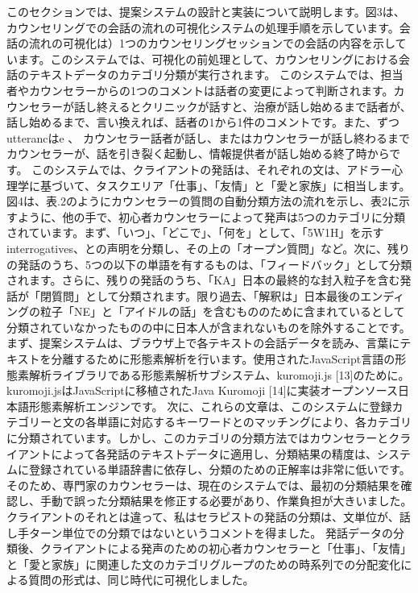 \documentclass[shuuron]{kuee}
\begin{document}
  このセクションでは、提案システムの設計と実装について説明します。図3は、カウンセリングでの会話の流れの可視化システムの処理手順を示しています。会話の流れの可視化は）1つのカウンセリングセッションでの会話の内容を示しています。このシステムでは、可視化の前処理として、カウンセリングにおける会話のテキストデータのカテゴリ分類が実行されます。
  このシステムでは、担当者やカウンセラーからの1つのコメントは話者の変更によって判断されます。カウンセラーが話し終えるとクリニックが話すと、治療が話し始めるまで話者が、話し始めるまで、言い換えれば、話者の1から1件のコメントです。また、ずつutterancはe  、 カウンセラー話者が話し、またはカウンセラーが話し終わるまでカウンセラーが、話を引き裂く起動し、情報提供者が話し始める終了時からです。
  このシステムでは、クライアントの発話は、それぞれの文は、アドラー心理学に基づいて、タスクエリア「仕事」、「友情」と「愛と家族」に相当します。図4は、表.2のようにカウンセラーの質問の自動分類方法の流れを示し、表2に示すように、他の手で、初心者カウンセラーによって発声は5つのカテゴリに分類されています。まず、「いつ」、「どこで」、「何を」として、「5W1H」を示すinterrogatives、との声明を分類し、その上の「オープン質問」など。次に、残りの発話のうち、5つの以下の単語を有するものは、「フィードバック」として分類されます。さらに、残りの発話のうち、「KA」日本の最終的な封入粒子を含む発話が「閉質問」として分類されます。限り過去、「解釈は」日本最後のエンディングの粒子「NE」と「アイドルの話」を含むもののために含まれているとして分類されていなかったものの中に日本人が含まれないものを除外することです。
まず、提案システムは、ブラウザ上で各テキストの会話データを読み、言葉にテキストを分離するために形態素解析を行います。使用されたJavaScript言語の形態素解析ライブラリである形態素解析サブシステム、kuromoji.js [13]のために。 kuromoji.jsはJavaScriptに移植されたJava Kuromoji [14]に実装オープンソース日本語形態素解析エンジンです。
  次に、これらの文章は、このシステムに登録カテゴリーと文の各単語に対応するキーワードとのマッチングにより、各カテゴリに分類されています。しかし、このカテゴリの分類方法ではカウンセラーとクライアントによって各発話のテキストデータに適用し、分類結果の精度は、システムに登録されている単語辞書に依存し、分類のための正解率は非常に低いです。そのため、専門家のカウンセラーは、現在のシステムでは、最初の分類結果を確認し、手動で誤った分類結果を修正する必要があり、作業負担が大きいました。クライアントのそれとは違って、私はセラピストの発話の分類は、文単位が、話し手ターン単位での分類ではないというコメントを得ました。
発話データの分類後、クライアントによる発声のための初心者カウンセラーと「仕事」、「友情」と「愛と家族」に関連した文のカテゴリグループのための時系列での分配変化による質問の形式は、同じ時代に可視化しました。
\end{document}

